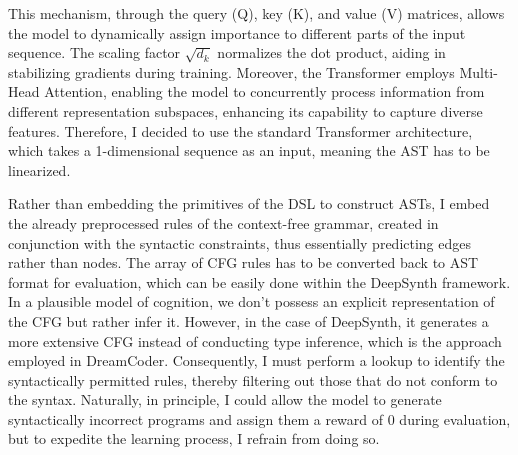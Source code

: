 This mechanism, through the query (Q), key (K), and value (V) matrices, allows the model to dynamically assign importance to different parts of the input sequence. The scaling factor $\sqrt{d_k}$ normalizes the dot product, aiding in stabilizing gradients during training. Moreover, the Transformer employs Multi-Head Attention, enabling the model to concurrently process information from different representation subspaces, enhancing its capability to capture diverse features. 
Therefore, I decided to use the standard Transformer architecture, which takes a 1-dimensional sequence as an input, meaning the AST has to be linearized. 

Rather than embedding the primitives of the DSL to construct ASTs, I embed the already preprocessed rules of the context-free grammar, created in conjunction with the syntactic constraints, thus essentially predicting edges rather than nodes. The array of CFG rules has to be converted back to AST format for evaluation, which can be easily done within the DeepSynth framework.
In a plausible model of cognition, we don't possess an explicit representation of the CFG but rather infer it.
However, in the case of DeepSynth, it generates a more extensive CFG instead of conducting type inference, which is the approach employed in DreamCoder. Consequently, I must perform a lookup to identify the syntactically permitted rules, thereby filtering out those that do not conform to the syntax. Naturally, in principle, I could allow the model to generate syntactically incorrect programs and assign them a reward of 0 during evaluation, but to expedite the learning process, I refrain from doing so.


